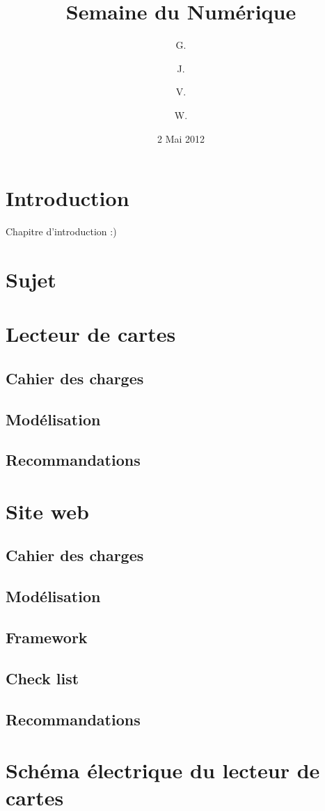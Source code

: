 \documentclass{report}
\title{Semaine du Numérique}
\author{
   G. \bsc{Guisez}
   \and
   J. \bsc{Hennani}
   \and
   V. \bsc{Hiairrassary}
   \and
   W. \bsc{Tassoux}
}
\date{2 Mai 2012}
\begin{document}
    \maketitle
    \tableofcontents

    \chapter{Introduction}
    Chapitre d'introduction :)

    \chapter{Sujet}

    \chapter{Lecteur de cartes}
        \section{Cahier des charges}
        \section{Modélisation}
        \section{Recommandations}

    \chapter{Site web}
        \section{Cahier des charges}
        \section{Modélisation}
        \section{Framework}
            \cite{ref_framework_mvc}

        \section{Check list}
        \section{Recommandations}

\appendix
    \chapter{Schéma électrique du lecteur de cartes}

    
    
\end{document}

